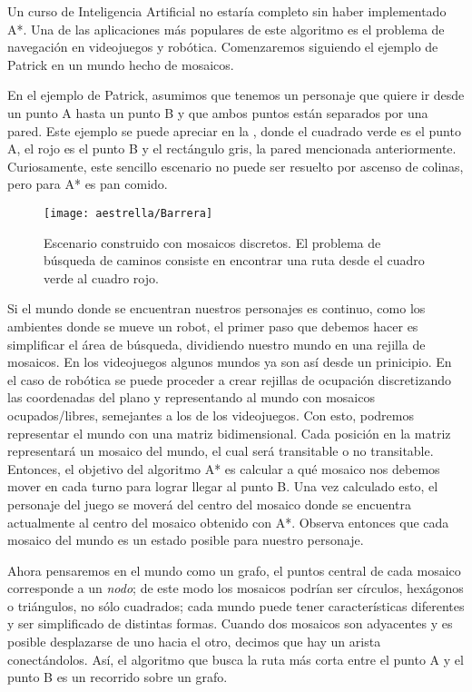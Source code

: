 Un curso de Inteligencia Artificial no estaría completo sin haber implementado A*.  Una de las aplicaciones más populares de este algoritmo es el problema de navegación en videojuegos y robótica.  Comenzaremos siguiendo el ejemplo de Patrick \cite{Lester2003} en un mundo hecho de mosaicos.

En el ejemplo de Patrick, asumimos que tenemos un personaje que quiere ir desde un punto A hasta un punto B y que ambos puntos están separados por una pared. Este ejemplo se puede apreciar en la , donde el cuadrado verde es el punto A, el rojo es el punto B y el rectángulo gris, la pared mencionada anteriormente.  Curiosamente, este sencillo escenario no puede ser resuelto por ascenso de colinas, pero para A* es pan comido.

\begin{figure}
  \centering
  \texttt{[image: aestrella/Barrera]}
  \caption{Escenario construido con mosaicos discretos. El problema de búsqueda de caminos consiste en encontrar una ruta desde el cuadro verde al cuadro rojo.}
  \label{fig:AEstrellaIni}
\end{figure}

Si el mundo donde se encuentran nuestros personajes es continuo, como los ambientes donde se mueve un robot, el primer paso que debemos hacer es simplificar el área de búsqueda, dividiendo nuestro mundo en una rejilla de mosaicos.  En los videojuegos algunos mundos ya son así desde un prinicipio.  En el caso de robótica se puede proceder a crear rejillas de ocupación discretizando las coordenadas del plano y representando al mundo con mosaicos ocupados/libres, semejantes a los de los videojuegos.  Con esto, podremos representar el mundo con una matriz bidimensional. Cada posición en la matriz representará un mosaico del mundo, el cual será transitable o no transitable. Entonces, el objetivo del algoritmo A* es calcular a qué mosaico nos debemos mover en cada turno para lograr llegar al punto B. Una vez calculado esto, el personaje del juego se moverá del centro del mosaico donde se encuentra actualmente al centro del mosaico obtenido con A*.  Observa entonces que cada mosaico del mundo es un estado posible para nuestro personaje.


Ahora pensaremos en el mundo como un grafo, el puntos central de cada mosaico corresponde a un \textit{nodo}; de este modo los mosaicos podrían ser círculos, hexágonos o triángulos, no sólo cuadrados; cada mundo puede tener características diferentes y ser simplificado de distintas formas.  Cuando dos mosaicos son adyacentes y es posible desplazarse de uno hacia el otro, decimos que hay un arista conectándolos.  Así, el algoritmo que busca la ruta más corta entre el punto A y el punto B es un recorrido sobre un grafo.



